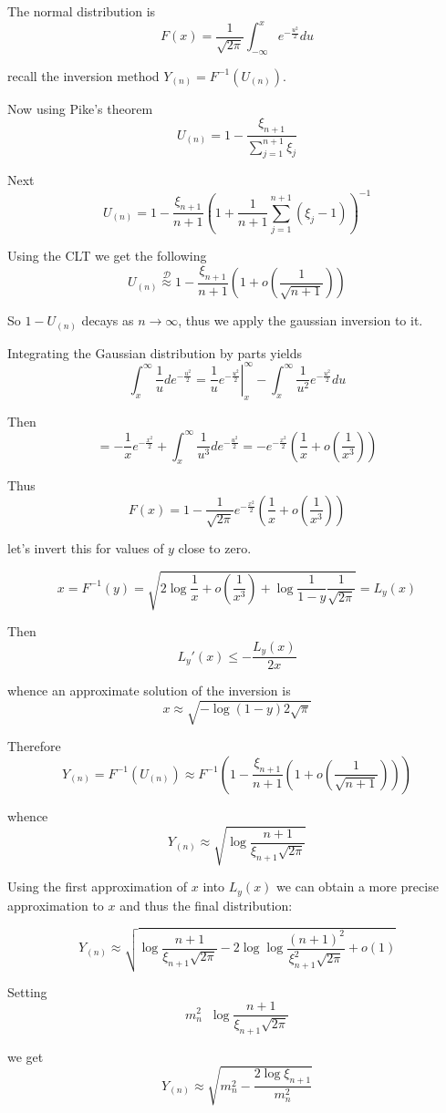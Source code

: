 \documentclass[a4paper]{article}
\newcommand{\brac}[1]{{\left ( #1 \right )}}
\newcommand{\induc}[1]{{\left . #1 \right \vert}}
\newcommand{\Dcal}{\mathcal{D}}
\newcommand{\defn}{\mathop{\overset{\Delta}{=}}\nolimits}
\begin{document}
The normal distribution is 
\[F(x) = \frac{1}{\sqrt{2\pi}} \int_{-\infty}^x e^{-\frac{u^2}{2}}du\]

recall the inversion method $Y_{(n)} = F^{-1}(U_{(n)})$.

Now using Pike's theorem
\[U_{(n)} = 1-\frac{ \xi_{n+1}}{\sum_{j=1}^{n+1} \xi_j}\]

Next
\[U_{(n)} = 1-\frac{ \xi_{n+1}}{n+1}\brac{1 + \frac{1}{n+1}\sum_{j=1}^{n+1} {(\xi_j-1)}}^{-1}\]

Using the CLT we get the following
\[U_{(n)} \overset{\Dcal}{\approx} 1-\frac{\xi_{n+1}}{n+1}\brac{1+o(\frac{1}{\sqrt{n+1}})}\]

So $1-U_{(n)}$ decays as $n\to \infty$, thus we apply the gaussian inversion to it.

Integrating the Gaussian distribution by parts yields
\[\int_x^\infty \frac{1}{u} de^{-\frac{u^2}{2}} =  \induc{ \frac{1}{u} e^{-\frac{u^2}{2}} }_x^\infty - \int_x^\infty \frac{1}{u^2} e^{-\frac{u^2}{2}}du\]

Then 
\[= - \frac{1}{x} e^{-\frac{x^2}{2}}
+ \int_x^\infty \frac{1}{u^3} de^{-\frac{u^2}{2}} 
= - e^{-\frac{x^2}{2}} \brac{\frac{1}{x} + o(\frac{1}{x^3})}\]

Thus
\[F(x) = 1 - \frac{1}{\sqrt{2\pi}}e^{-\frac{x^2}{2}} \brac{\frac{1}{x} + o(\frac{1}{x^3})}\]

let's invert this for values of $y$ close to zero.

\[ x = F^{-1}(y) = \sqrt{ 2\log{\frac{1}{x}+o(\frac{1}{x^3})} + \log \frac{1}{1-y}\frac{1}{\sqrt{2\pi}}} = L_y(x) \]

Then 
\[L_y'(x) \leq - \frac{L_y(x)}{2x}\]

whence an approximate solution of the inversion is
\[ x\approx \sqrt{-\log{(1-y)2\sqrt{\pi}}}\]

Therefore
\[Y_{(n)} = F^{-1}(U_{(n)}) \approx F^{-1}\brac{1-\frac{\xi_{n+1}}{n+1}\brac{1+o(\frac{1}{\sqrt{n+1}})}}\]

whence 
\[Y_{(n)} \approx \sqrt{ \log \frac{n+1}{\xi_{n+1} \sqrt{2\pi} } } \]

Using the first approximation of $x$ into $L_y(x)$ we can obtain a more precise approximation to $x$ and thus the final distribution:

\[ Y_{(n)} \approx \sqrt{ \log \frac{n+1}{\xi_{n+1} \sqrt{2\pi} } - 2\log \log \frac{{(n+1)}^2}{\xi_{n+1}^2 \sqrt{2\pi} }  + o(1) }  \]

Setting 
\[m_n^2 \defn \log \frac{n+1}{\xi_{n+1} \sqrt{2\pi} } \]

we get 
\[Y_{(n)} \approx \sqrt{ m_n^2 - \frac{2\log \xi_{n+1}}{m_n^2} }\]
\end{document}
